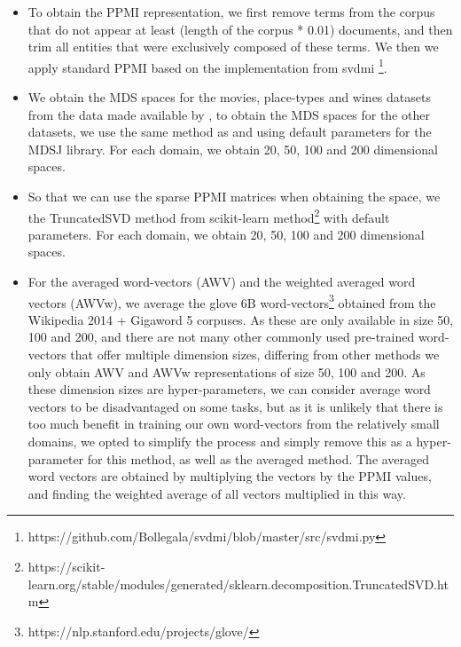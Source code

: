 \documentclass{article}
\begin{document}
 \begin{itemize}
    \item To obtain the PPMI representation, we first remove terms from the corpus that do not appear at least (length of the corpus * 0.01) documents, and then trim all entities that were exclusively composed of these terms. We then we apply standard PPMI based on the implementation from svdmi \footnote{https://github.com/Bollegala/svdmi/blob/master/src/svdmi.py}.
     \item We obtain the MDS spaces for the movies, place-types and wines datasets from the data made available by \cite{Derrac2015}, to obtain the MDS spaces for the other datasets, we use the same method as \cite{Derrac2015} and using default parameters for the MDSJ library. For each domain, we obtain 20, 50, 100 and 200 dimensional spaces.
     \item So that we can use the sparse PPMI matrices when obtaining the space, we the TruncatedSVD method from scikit-learn method\footnote{https://scikit-learn.org/stable/modules/generated/sklearn.decomposition.TruncatedSVD.htm} with default parameters. For each domain, we obtain 20, 50, 100 and 200 dimensional spaces. %
     \item For the averaged word-vectors (AWV) and the weighted averaged word vectors (AWVw), we average the glove 6B word-vectors\footnote{https://nlp.stanford.edu/projects/glove/} obtained from the Wikipedia 2014 + Gigaword 5 corpuses. As these are only available in size 50, 100 and 200, and there are not many other commonly used pre-trained word-vectors that offer multiple dimension sizes, differing from other methods we only obtain AWV and AWVw representations of size 50, 100 and 200. As these dimension sizes are hyper-parameters, we can consider average word vectors to be disadvantaged on some tasks, but as it is unlikely that there is too much benefit in training our own word-vectors from the relatively small domains, we opted to simplify the process and simply remove this as a hyper-parameter for this method, as well as the averaged method. The averaged word vectors are obtained by multiplying the vectors by the PPMI values, and finding the weighted average of all vectors multiplied in this way. %

\end{itemize}
\end{document}
